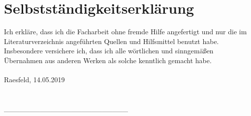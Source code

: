 \documentclass[12pt,a4paper]{article}
\begin{document}
	\section{Selbstständigkeitserklärung}
	Ich erkläre, dass ich die Facharbeit ohne fremde Hilfe angefertigt und nur die
	im Literaturverzeichnis angeführten Quellen und Hilfsmittel benutzt habe.
	Insbesondere versichere ich, dass ich alle wörtlichen und sinngemäßen
	Übernahmen aus anderen Werken als solche kenntlich gemacht habe.
	\\\\
	Raesfeld, 14.05.2019
	\\\\\\
	\_\_\_\_\_\_\_\_\_\_\_\_\_\_\_\_\_\_\_\_\_\_\_\_
\end{document}
